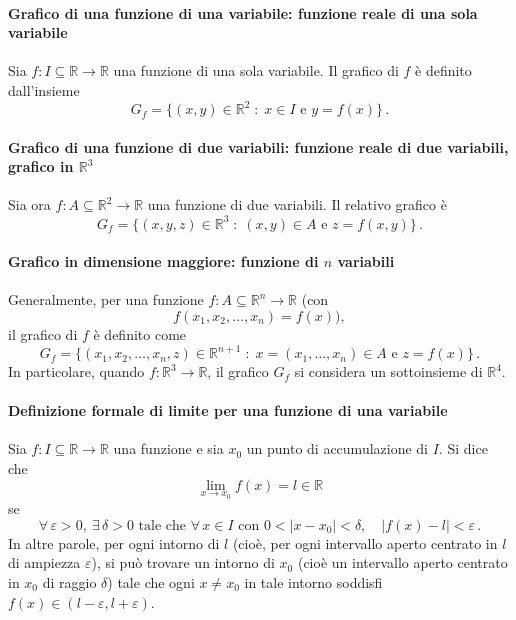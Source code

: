 \documentclass{article}
\theoremstyle{plain}
\theoremstyle{definition}
\theoremstyle{remark}
\begin{document}
\paragraph{Grafico di una funzione di una variabile: funzione reale di una sola variabile}
Sia \(f : I \subseteq \mathbb{R} \to \mathbb{R}\) una funzione di una sola variabile. Il grafico di \(f\) è definito dall'insieme
\[
G_f=\{(x,y)\in\mathbb{R}^2 \;:\; x\in I \text{ e } y=f(x)\}\,.
\]


\paragraph{Grafico di una funzione di due variabili: funzione reale di due variabili, grafico in $\mathbb{R}^3$}
Sia ora \(f : A \subseteq \mathbb{R}^2 \to \mathbb{R}\) una funzione di due variabili. Il relativo grafico è 
\[
G_f=\{(x,y,z)\in\mathbb{R}^3 \;:\; (x,y)\in A \text{ e } z=f(x,y)\}\,.
\]


\paragraph{Grafico in dimensione maggiore: funzione di $n$ variabili}
Generalmente, per una funzione \(f : A \subseteq \mathbb{R}^n \to \mathbb{R}\) (con
\[
f(x_1,x_2,\dots,x_n)=f(x)),
\]
il grafico di \(f\) è definito come
\[
G_f=\{(x_1,x_2,\dots,x_n,z)\in\mathbb{R}^{n+1} \;:\; x=(x_1,\dots,x_n)\in A \text{ e } z=f(x)\}\,.
\]
In particolare, quando \(f\colon \mathbb{R}^3\to\mathbb{R}\), il grafico \(G_f\) si considera un sottoinsieme di \(\mathbb{R}^4\).

\paragraph{Definizione formale di limite per una funzione di una variabile}
Sia \(f : I \subseteq \mathbb{R} \to \mathbb{R}\) una funzione e sia \(x_0\) un punto di accumulazione di \(I\). 
Si dice che 
\[
\lim_{x\to x_0}f(x)=l\in\mathbb{R}
\]
se
\[
\forall\,\varepsilon>0,\ \exists\,\delta>0 \text{ tale che } \forall\, x\in I \text{ con } 0<|x-x_0|<\delta,\quad |f(x)-l|<\varepsilon\,.
\]
In altre parole, per ogni intorno di \(l\) (cioè, per ogni intervallo aperto centrato in \(l\) di ampiezza \(\varepsilon\)), si può trovare un intorno di \(x_0\) (cioè un intervallo aperto centrato in \(x_0\) di raggio \(\delta\)) tale che ogni \(x\neq x_0\) in tale intorno soddisfi \(f(x)\in (l-\varepsilon,l+\varepsilon)\).
\end{document}
